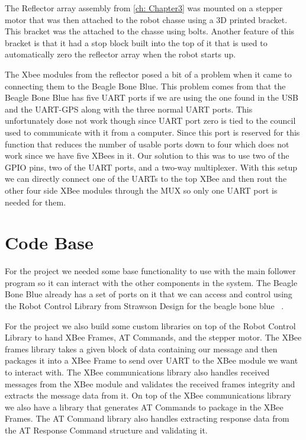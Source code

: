 The Reflector array assembly from \autoref{ch: Chapter3} was mounted on a stepper motor that was then attached to the robot chasse using a 3D printed bracket.  This bracket was the attached to the chasse using bolts.  Another feature of this bracket is that it had a stop block built into the top of it that is used to automatically zero the reflector array when the robot starts up.\par
The Xbee modules from the reflector posed a bit of a problem when it came to connecting them to the Beagle Bone Blue.  This problem comes from that the Beagle Bone Blue has five UART ports if we are using the one found in the USB and the UART-GPS along with the three normal UART ports.  This unfortunately dose not work though since UART port zero is tied to the council used to communicate with it from a computer.  Since this port is reserved for this function that reduces the number of usable ports down to four which does not work since we have five XBees in it.  Our solution to this was to use two of the GPIO pins, two of the UART ports, and a two-way multiplexer.  With this setup we can directly connect one of the UARTs to the top XBee and then rout the other four side XBee modules through the MUX so only one UART port is needed for them.


\section{Code Base}
\label{sec:Code Base}

For the project we needed some base functionality to use with the main follower program so it can interact with the other components in the system.  The Beagle Bone Blue already has a set of ports on it that we can access and control using the Robot Control Library from Strawson Design for the beagle bone blue ~\cite{Robot_Control_Library}. \par
For the project we also build some custom libraries on top of the Robot Control Library to hand XBee Frames, AT Commands, and the stepper motor.  The XBee frames library takes a given block of data containing our message and then packages it into a XBee Frame to send over UART to the XBee module we want to interact with.  The XBee communications library also handles received messages from the XBee module and validates the received frames integrity and extracts the message data from it.  On top of the XBee communications library we also have a library that generates AT Commands to package in the XBee Frames.  The AT Command library also handles extracting response data from the AT Response Command structure and validating it.

